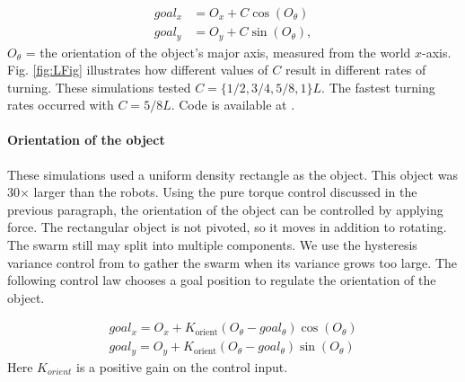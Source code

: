 \begin{align}\nonumber
goal_x &= O_x + C \cos(O_{\theta}) \\
goal_y &= O_y + C \sin(O_{\theta}),  \label{eq:TorqueControl}
\end{align}
$O_{\theta}$ = the orientation of the object's major axis, measured from the world $x$-axis.
 Fig. \ref{fig:LFig} illustrates how different values of $C$ result in different rates of turning. These simulations tested $C = \{1/2, 3/4, 5/8, 1\}L$. The fastest turning rates occurred with  $C =  5/8L$. Code is available at \cite{Shahrokhi16torque}.

%


\paragraph{Orientation of the object}
These simulations used a uniform density rectangle as the object. This object was 30$\times$ larger than the robots.
Using the pure torque control discussed in the previous paragraph, the orientation of the object can be controlled by applying force. 
The rectangular object is not pivoted, so it moves in addition to rotating. 
 The swarm still may split into multiple components.
  We use the hysteresis variance control from \cite{ShahrokhiIROS2015}  to gather the swarm when its variance grows too large. 
  The following control law chooses a goal position to regulate the orientation of the object.  
  
 \begin{align}\nonumber
goal_x = O_x +  K_{\textrm{orient}}  (O_{\theta} - goal_\theta ) \cos(O_{\theta}) \\
goal_y = O_y +  K_{\textrm{orient}}   ( O_{\theta} -goal_\theta  ) \sin(O_{\theta})
\end{align}
Here $K_{orient}$ is a positive gain on the control input.  



